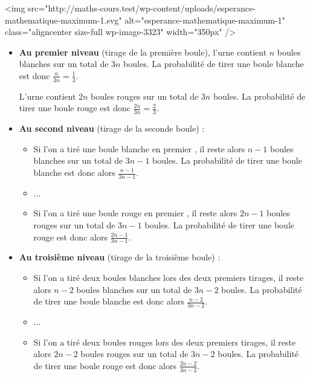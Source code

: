\begin{corrige}
\begin{enumerate}
\begin{center}
\end{center}
<img src="http://maths-cours.test/wp-content/uploads/esperance-mathematique-maximum-1.svg" alt="esperance-mathematique-maximum-1" class="aligncenter size-full wp-image-3323" width="350px" />
          \begin{itemize}
               \item
               \textbf{Au premier niveau} (tirage de la première boule), l'urne contient $n$ boules blanches sur un total de $3n$ boules. La probabilité de tirer une boule blanche est donc $\frac{n}{3n} = \frac{1}{3}$.
               \par
               L'urne contient $2n$ boules rouges sur un total de $3n$ boules. La probabilité de tirer une boule rouge est donc $\frac{2n}{3n} = \frac{2}{3}$.
               \item
               \textbf{Au second niveau} (tirage de la seconde boule) :
               \begin{itemize}
                    \item
                    Si l'on a tiré une boule blanche en premier ,  il reste alors $n-1$ boules blanches sur un total de $3n-1$ boules. La probabilité de tirer une boule blanche est donc alors $\frac{n-1}{3n-1}$.
                    \item
                    ...
                    \item
                    Si l'on a tiré une boule rouge  en premier ,  il reste alors $2n-1$ boules rouges sur un total de $3n-1$ boules. La probabilité de tirer une boule rouge est donc alors $\frac{2n-1}{3n-1}$.
               \end{itemize}
               \item
               \textbf{Au troisième niveau} (tirage de la troisième boule) :
               \begin{itemize}
                    \item
                    Si l'on a tiré deux boules blanches lors des deux premiers tirages,  il reste alors $n-2$ boules blanches sur un total de $3n-2$ boules. La probabilité de tirer une boule blanche est donc alors $\frac{n-2}{3n-2}$.
                    \item
                    ...
                    \item
                    Si l'on a tiré deux boules rouges lors des deux premiers tirages, il reste alors $2n-2$ boules rouges sur un total de $3n-2$ boules. La probabilité de tirer une boule rouge est donc alors $\frac{2n-2}{3n-2}$.

\end{itemize}
\end{itemize}
\end{enumerate}
\end{corrige}
